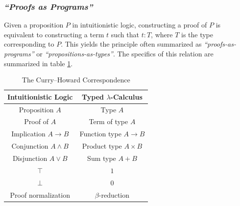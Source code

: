 \subsubsection{\centering \textit{``Proofs as Programs''}}
Given a proposition $P$ in intuitionistic logic, constructing a proof of $P$ is equivalent to constructing a term $t$ such that $t : T$, where $T$ is the type corresponding to $P$. This yields the principle often summarized as \emph{``proofs-as-programs''} or \emph{``propositions-as-types''}. The specifics of this relation are summarized in table \ref{tab:curry-howard}.

\begin{table}[h!]
  \centering
    \caption{The Curry--Howard Correspondence}
  \begin{tabular}{|c|c|}
    \hline
    \textbf{Intuitionistic Logic} & \textbf{Typed $\lambda$-Calculus} \\
    \hline
    Proposition $A$ & Type $A$ \\
    Proof of $A$ & Term of type $A$ \\
    Implication $A \rightarrow B$ & Function type $A \to B$ \\
    Conjunction $A \land B$ & Product type $A \times B$ \\
    Disjunction $A \lor B$ & Sum type $A + B$ \\
    $\top$ & $1$ \\
    $\bot$ & $0$ \\
    Proof normalization & $\beta$-reduction \\
    \hline
  \end{tabular}
  \label{tab:curry-howard}
\end{table}

